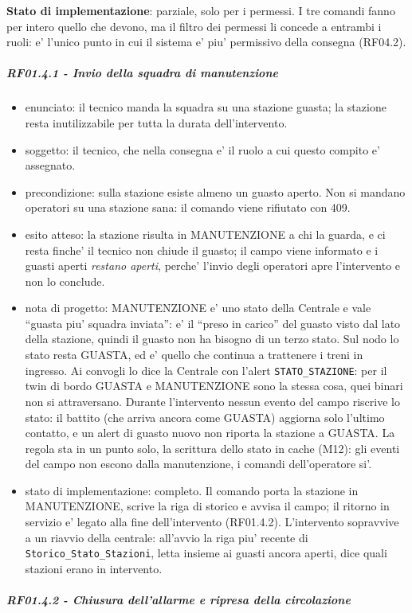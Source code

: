 \documentclass[11pt]{article}
\begin{document}
\textbf{Stato di implementazione}: parziale, solo per i permessi. I tre comandi fanno per intero quello che
devono, ma il filtro dei permessi li concede a entrambi i ruoli: e' l'unico punto in cui il sistema
e' piu' permissivo della consegna (RF04.2).
\subparagraph{RF01.4.1 - Invio della squadra di manutenzione}
\label{sec:org64bad65}
\begin{itemize}
\item enunciato: il tecnico manda la squadra su una stazione guasta; la stazione resta inutilizzabile
per tutta la durata dell'intervento.
\item soggetto: il tecnico, che nella consegna e' il ruolo a cui questo compito e' assegnato.
\item precondizione: sulla stazione esiste almeno un guasto aperto. Non si mandano operatori su una
stazione sana: il comando viene rifiutato con 409.
\item esito atteso: la stazione risulta in MANUTENZIONE a chi la guarda, e ci resta finche' il tecnico
non chiude il guasto; il campo viene informato e i guasti aperti \emph{restano aperti}, perche' l'invio
degli operatori apre l'intervento e non lo conclude.
\item nota di progetto: MANUTENZIONE e' uno stato della Centrale e vale ``guasta piu' squadra inviata'':
e' il ``preso in carico'' del guasto visto dal lato della stazione, quindi il guasto non ha bisogno
di un terzo stato. Sul nodo lo stato resta GUASTA, ed e' quello che continua a trattenere i treni
in ingresso. Ai convogli lo dice la Centrale con l'alert \texttt{STATO\_STAZIONE}: per il twin di bordo
GUASTA e MANUTENZIONE sono la stessa cosa, quei binari non si attraversano. Durante l'intervento
nessun evento del campo riscrive lo stato: il battito (che arriva ancora come GUASTA) aggiorna solo
l'ultimo contatto, e un alert di guasto nuovo non riporta la stazione a GUASTA. La regola sta in un
punto solo, la scrittura dello stato in cache (M12): gli eventi del campo non escono dalla
manutenzione, i comandi dell'operatore si'.
\item stato di implementazione: completo. Il comando porta la stazione in MANUTENZIONE, scrive la riga
di storico e avvisa il campo; il ritorno in servizio e' legato alla fine dell'intervento
(RF01.4.2). L'intervento sopravvive a un riavvio della centrale: all'avvio la riga piu' recente di
\texttt{Storico\_Stato\_Stazioni}, letta insieme ai guasti ancora aperti, dice quali stazioni erano in
intervento.
\end{itemize}
\subparagraph{RF01.4.2 - Chiusura dell'allarme e ripresa della circolazione}
\end{document}
